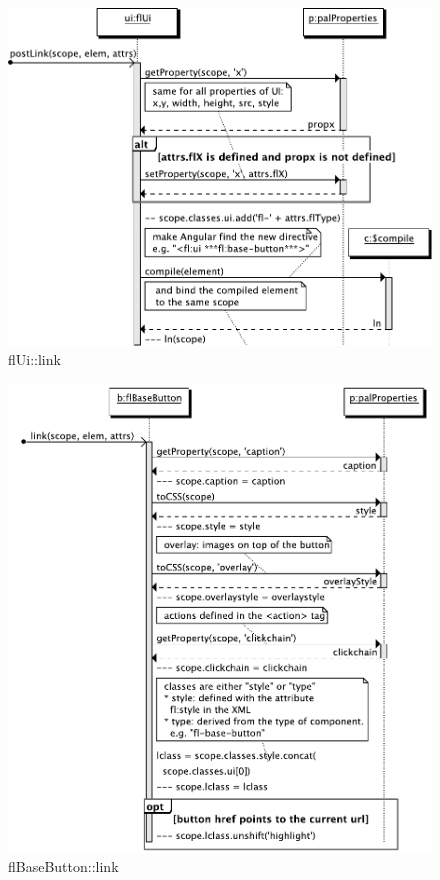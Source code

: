 \begin{figure}[htb]
    \centering
    \includegraphics{figures/design/seqdia/ui-link.pdf}
    \caption{flUi::link}
    \label{fig:design-seqdia-ui-link}
\end{figure}

\begin{figure}[htb]
    \centering
    \includegraphics{figures/design/seqdia/basebutton-link.pdf}
    \caption{flBaseButton::link}
    \label{fig:design-seqdia-basebutton-link}
\end{figure}


